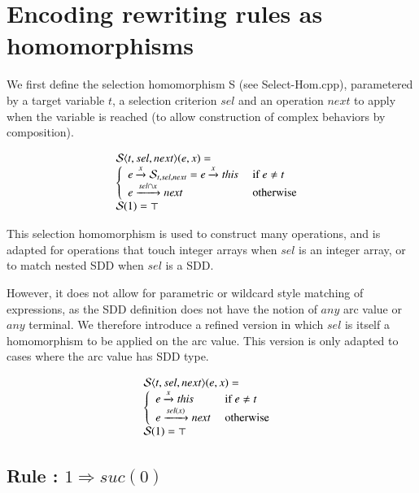 \section{Encoding rewriting rules as homomorphisms}
\label{sec:hom}


We first define the selection homomorphism {\cal S} (see Select-Hom.cpp), parametered by a target variable $t$, a selection criterion $sel$ and an operation $next$ to apply when the variable is reached (to allow construction of complex behaviors by composition).

$$
\begin{array}{lcl}
{\cal S}\langle {t,sel,next} \rangle (e,x)= \\
\left\{\begin{array}{ll}
 e \xrightarrow{\scriptstyle {x}} {\cal S}_{t,sel,next} =  e \xrightarrow{\scriptstyle {x}} \mathit{this} & \mbox{ if } e \neq t \\
 e \xrightarrow{\scriptstyle {sel \cap x}} \mathit{next} & \mbox{ otherwise } \\
\end{array}
\right. \\
 {\cal S}(1) = \top 
\end{array}
$$

This selection homomorphism is used to construct many operations, and is adapted for operations that touch integer arrays when $sel$ is an integer array, or to match nested SDD when $sel$ is a SDD.

However, it does not allow for parametric or wildcard style matching of expressions, as the SDD definition does not have the notion of $any$ arc value or $any$ terminal. We therefore introduce a refined version in which $sel$ is itself a homomorphism to be applied on the arc value. This version is only adapted to cases where the arc value has SDD type.


$$
\begin{array}{lcl}
{\cal S}\langle {t,sel,next} \rangle (e,x)= \\
\left\{\begin{array}{ll}
 e \xrightarrow{\scriptstyle {x}} \mathit{this} & \mbox{ if } e \neq t \\
 e \xrightarrow{\scriptstyle {sel (x) }} \mathit{next} & \mbox{ otherwise } \\
\end{array}
\right. \\
 {\cal S}(1) = \top 
\end{array}
$$

\subsection{Rule : $1 \Rightarrow suc(0)$}

